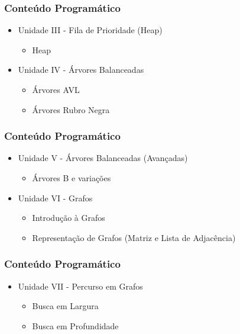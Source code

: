 \documentclass[aspectratio=169]{beamer}
\begin{document}

\begin{frame}
\frametitle{Conteúdo Programático}
\begin{itemize}
  \item Unidade III - Fila de Prioridade (Heap)
  \begin{itemize}
  \item Heap
  \end{itemize}
 
  \item Unidade IV - Árvores Balanceadas 
  \begin{itemize}
  \item Árvores AVL 
  \item Árvores Rubro Negra  
  \end{itemize}
 \end{itemize}
 \end{frame}


\begin{frame}
\frametitle{Conteúdo Programático}
\begin{itemize}
  \item Unidade V - Árvores Balanceadas (Avançadas)
  \begin{itemize}
  \item Árvores B e variações    
  \end{itemize}
  
  \item Unidade VI - Grafos
  \begin{itemize}
  \item Introdução à Grafos
  \item Representação de Grafos (Matriz e Lista de Adjacência)
  \end{itemize}  
\end{itemize}
 \end{frame}
 

\begin{frame}
\frametitle{Conteúdo Programático}
\begin{itemize}
   \item Unidade VII - Percurso em Grafos
  \begin{itemize}
  \item Busca em Largura 
  \item Busca em Profundidade
  \end{itemize}
\end{itemize}
 \end{frame}
\end{document}
